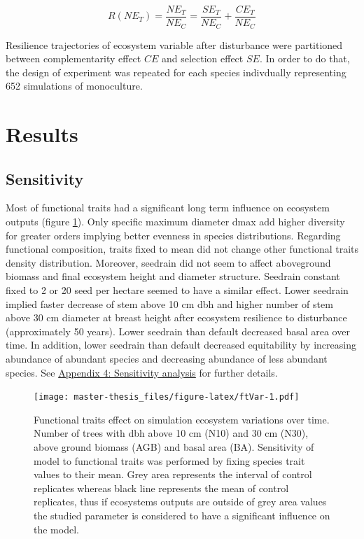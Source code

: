 \documentclass[12pt,]{article}
\let\oldsection\section
\renewcommand\section{\newpage\oldsection}
\theoremstyle{definition}
\theoremstyle{definition}
\theoremstyle{remark}
\begin{document}
\begin{equation}
  R(NE_T) = \frac{NE_T}{NE_C} = \frac{SE_T}{NE_C} + \frac{CE_T}{NE_C}
  \label{eq:RNE}
\end{equation}

Resilience trajectories of ecosystem variable after disturbance were
partitioned between complementarity effect \(CE\) and selection effect
\(SE\). In order to do that, the design of experiment was repeated for
each species indivdually representing 652 simulations of monoculture.

\section{Results}\label{results}

\subsection{Sensitivity}\label{sensitivity}

Most of functional traits had a significant long term influence on
ecosystem outputs (figure \ref{fig:ftVar}). Only specific maximum
diameter dmax add higher diversity for greater orders implying better
evenness in species distributions. Regarding functional composition,
traits fixed to mean did not change other functional traits density
distribution. Moreover, seedrain did not seem to affect aboveground
biomass and final ecosystem height and diameter structure. Seedrain
constant fixed to 2 or 20 seed per hectare seemed to have a similar
effect. Lower seedrain implied faster decrease of stem above 10 cm dbh
and higher number of stem above 30 cm diameter at breast height after
ecosystem resilience to disturbance (approximately 50 years). Lower
seedrain than default decreased basal area over time. In addition, lower
seedrain than default decreased equitability by increasing abundance of
abundant species and decreasing abundance of less abundant species. See
\protect\hyperlink{appendix-4-sensitivity-analysis}{Appendix 4:
Sensitivity analysis} for further details.

\begin{figure}[htbp]
\centering
\texttt{[image: master-thesis\_files/figure-latex/ftVar-1.pdf]}
\caption{\label{fig:ftVar}Functional traits effect on simulation ecosystem
variations over time. Number of trees with dbh above 10 cm (N10) and 30
cm (N30), above ground biomass (AGB) and basal area (BA). Sensitivity of
model to functional traits was performed by fixing species trait values
to their mean. Grey area represents the interval of control replicates
whereas black line represents the mean of control replicates, thus if
ecosystems outputs are outside of grey area values the studied parameter
is considered to have a significant influence on the model.}
\end{figure}
\end{document}
